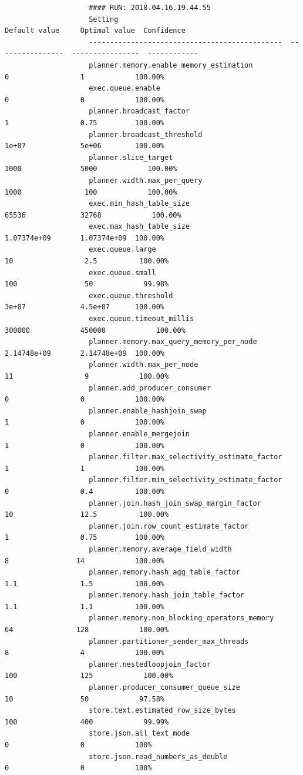 \documentclass[a4paper,english]{report}
\begin{document}
				\begin{verbatim}
					#### RUN: 2018.04.16.19.44.55
					Setting                                            Default value     Optimal value  Confidence
					----------------------------------------------  ----------------  ----------------  ------------
					planner.memory.enable_memory_estimation              0                 1            100.00%
					exec.queue.enable                                    0                 0            100.00%
					planner.broadcast_factor                             1                 0.75         100.00%
					planner.broadcast_threshold                          1e+07             5e+06        100.00%
					planner.slice_target                              1000              5000            100.00%
					planner.width.max_per_query                       1000               100            100.00%
					exec.min_hash_table_size                         65536             32768            100.00%
					exec.max_hash_table_size                             1.07374e+09       1.07374e+09  100.00%
					exec.queue.large                                    10                 2.5          100.00%
					exec.queue.small                                   100                50            99.98%
					exec.queue.threshold                                 3e+07             4.5e+07      100.00%
					exec.queue.timeout_millis                       300000            450000            100.00%
					planner.memory.max_query_memory_per_node             2.14748e+09       2.14748e+09  100.00%
					planner.width.max_per_node                          11                 9            100.00%
					planner.add_producer_consumer                        0                 0            100.00%
					planner.enable_hashjoin_swap                         1                 0            100.00%
					planner.enable_mergejoin                             1                 0            100.00%
					planner.filter.max_selectivity_estimate_factor       1                 1            100.00%
					planner.filter.min_selectivity_estimate_factor       0                 0.4          100.00%
					planner.join.hash_join_swap_margin_factor           10                12.5          100.00%
					planner.join.row_count_estimate_factor               1                 0.75         100.00%
					planner.memory.average_field_width                   8                14            100.00%
					planner.memory.hash_agg_table_factor                 1.1               1.5          100.00%
					planner.memory.hash_join_table_factor                1.1               1.1          100.00%
					planner.memory.non_blocking_operators_memory        64               128            100.00%
					planner.partitioner_sender_max_threads               8                 4            100.00%
					planner.nestedloopjoin_factor                      100               125            100.00%
					planner.producer_consumer_queue_size                10                50            97.58%
					store.text.estimated_row_size_bytes                100               400            99.99%
					store.json.all_text_mode                             0                 0            100%
					store.json.read_numbers_as_double                    0                 0            100%
				\end{verbatim}
				\normalsize
\end{document}
